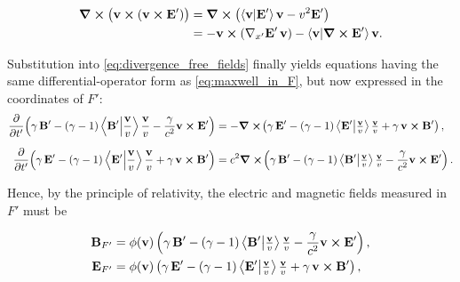 \documentclass[12pt]{article}
\begin{document}
\[
  \begin{aligned}
    \curl\bigl(\vb{v}\cross(\vb{v}\cross\vb{E}')\bigr)
    &=
    \curl\bigl(
      \ip{\vb{v}}{\vb{E}'}\vb{v}
      -
      v^2\vb{E}'
    \bigr)
    \\
    &=
    -\vb{v}\cross
    \left(
      \nabla_{x'}\vb{E}'\,\vb{v}
    \right)
    -
    \ip{\vb{v}}{\curl\vb{E}'}\vb{v}.
  \end{aligned}
\]

Substitution into \eqref{eq:divergence_free_fields} finally yields equations having the
same differential-operator form as \eqref{eq:maxwell_in_F}, but now expressed in the
coordinates of $F'$:
\begin{equation}
  \begin{aligned}
    \pdv{}{t'}\!\left(
        \gamma\,\vb{B}'
        -
        (\gamma-1)
        \ip{\vb{B}'}{\frac{\vb{v}}{v}}
        \frac{\vb{v}}{v}
        -
        \frac{\gamma}{c^2}\vb{v}\cross\vb{E}'
      \right)
    &=
    -\curl\!\left(
        \gamma\,\vb{E}'
        -
        (\gamma-1)
        \ip{\vb{E}'}{\tfrac{\vb{v}}{v}}
        \tfrac{\vb{v}}{v}
        +
        \gamma\,\vb{v}\cross\vb{B}'
      \right),
    \\[6pt]
    \pdv{}{t'}\!\left(
        \gamma\,\vb{E}'
        -
        (\gamma-1)
        \ip{\vb{E}'}{\frac{\vb{v}}{v}}
        \frac{\vb{v}}{v}
        +
        \gamma\,\vb{v}\cross\vb{B}'
      \right)
    &=
    c^2\curl\!\left(
        \gamma\,\vb{B}'
        -
        (\gamma-1)
        \ip{\vb{B}'}{\tfrac{\vb{v}}{v}}
        \tfrac{\vb{v}}{v}
        -
        \frac{\gamma}{c^2}\vb{v}\cross\vb{E}'
      \right).
  \end{aligned}
  \label{eq:pre_final_maxwell}
\end{equation}

Hence, by the principle of relativity, the electric and magnetic fields measured in $F'$
must be

\begin{align}
  \vb{B}_{F'}
  &=
  \phi(\vb{v})\left(
      \gamma\,\vb{B}'
      -
      (\gamma-1)
      \ip{\vb{B}'}{\tfrac{\vb{v}}{v}}
      \tfrac{\vb{v}}{v}
      -
      \frac{\gamma}{c^2}\vb{v}\cross\vb{E}'
    \right),
  \\
  \vb{E}_{F'}
  &=
  \phi(\vb{v})\left(
      \gamma\,\vb{E}'
      -
      (\gamma-1)
      \ip{\vb{E}'}{\tfrac{\vb{v}}{v}}
      \tfrac{\vb{v}}{v}
      +
      \gamma\,\vb{v}\cross\vb{B}'
    \right),
\end{align}
\end{document}
